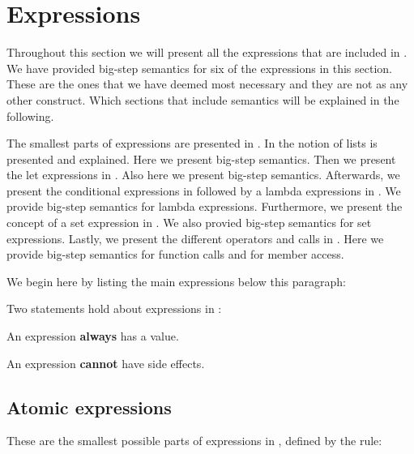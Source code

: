 \section{Expressions}
\label{sec:expressions}

Throughout this section we will present all the expressions that are included in
\productname{}. We have provided big-step semantics for six of the expressions
in this section. These are the ones that we have deemed most necessary and they
are not as any other construct. Which sections that include semantics will be
explained in the following.

The smallest parts of expressions are presented in
. In  the notion of
lists is presented and explained. Here we present big-step semantics. Then we
present the let expressions in . Also here we present
big-step semantics. Afterwards, we present the conditional expressions in 
 followed by a lambda expressions in
. We provide big-step semantics for lambda
expressions. Furthermore, we present the concept of a set expression in
. We also provied big-step semantics for set
expressions. Lastly, we present the different operators and calls in
. Here we provide big-step semantics for function
calls and for member access.

We begin here by listing the main expressions below this
paragraph:

\begin{ebnf}
\end{ebnf}

Two statements hold about expressions in \productname{}:

\begin{nlist}
\item An expression \textbf{always} has a value.
\item An expression \textbf{cannot} have side effects.
\end{nlist}

\subsection{Atomic expressions}
\label{sec:atomicexpressions}

These are the smallest possible parts of expressions in \productname{}, defined by
the rule:

